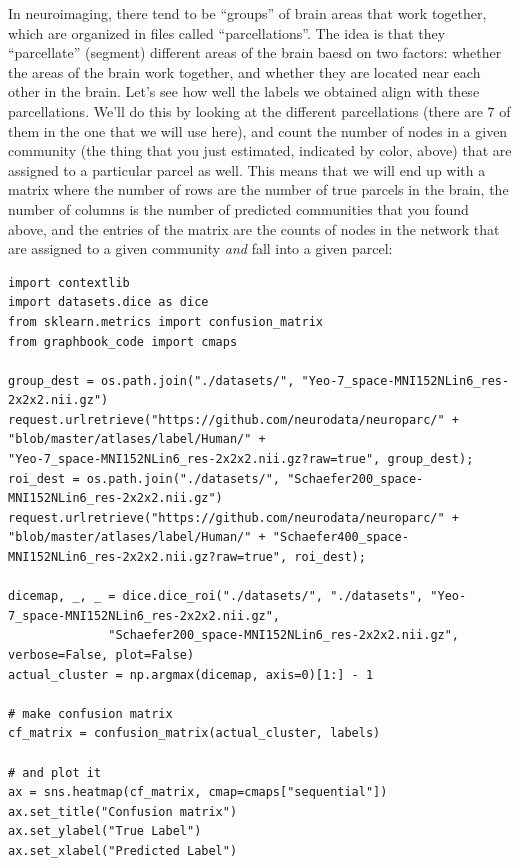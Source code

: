 In neuroimaging, there tend to be ``groups'' of brain areas that work together, which are organized in files called ``parcellations''. The idea is that they ``parcellate'' (segment) different areas of the brain baesd on two factors: whether the areas of the brain work together, and whether they are located near each other in the brain. Let's see how well the labels we obtained align with these parcellations. We'll do this by looking at the different parcellations (there are $7$ of them in the one that we will use here), and count the number of nodes in a given community (the thing that you just estimated, indicated by color, above) that are assigned to a particular parcel as well. This means that we will end up with a matrix where the number of rows are the number of true parcels in the brain, the number of columns is the number of predicted communities that you found above, and the entries of the matrix are the counts of nodes in the network that are assigned to a given community \emph{and} fall into a given parcel:

\begin{lstlisting}[style=python]
import contextlib
import datasets.dice as dice
from sklearn.metrics import confusion_matrix
from graphbook_code import cmaps

group_dest = os.path.join("./datasets/", "Yeo-7_space-MNI152NLin6_res-2x2x2.nii.gz")
request.urlretrieve("https://github.com/neurodata/neuroparc/" + "blob/master/atlases/label/Human/" +
"Yeo-7_space-MNI152NLin6_res-2x2x2.nii.gz?raw=true", group_dest);
roi_dest = os.path.join("./datasets/", "Schaefer200_space-MNI152NLin6_res-2x2x2.nii.gz")
request.urlretrieve("https://github.com/neurodata/neuroparc/" + "blob/master/atlases/label/Human/" + "Schaefer400_space-MNI152NLin6_res-2x2x2.nii.gz?raw=true", roi_dest);

dicemap, _, _ = dice.dice_roi("./datasets/", "./datasets", "Yeo-7_space-MNI152NLin6_res-2x2x2.nii.gz", 
              "Schaefer200_space-MNI152NLin6_res-2x2x2.nii.gz", verbose=False, plot=False)
actual_cluster = np.argmax(dicemap, axis=0)[1:] - 1

# make confusion matrix
cf_matrix = confusion_matrix(actual_cluster, labels)

# and plot it
ax = sns.heatmap(cf_matrix, cmap=cmaps["sequential"])
ax.set_title("Confusion matrix")
ax.set_ylabel("True Label")
ax.set_xlabel("Predicted Label")
\end{lstlisting}

